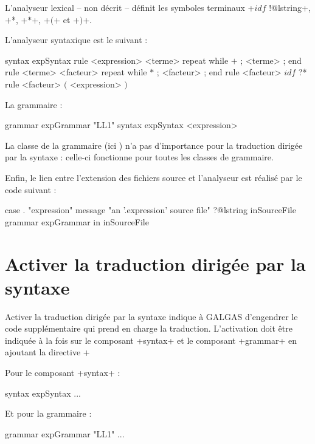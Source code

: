 L'analyseur lexical -- non décrit -- définit les symboles terminaux \ggs+$idf$ !@lstring+, \ggs*$+$*, \ggs+$*$+, \ggs+$($+ et \ggs+$)$+.

L'analyseur syntaxique est le suivant :
\begin{galgas}
syntax expSyntax {
  rule <expression> {
    <terme>
    repeat while $+$ ; <terme> ; end
  }
  rule <terme> {
    <facteur>
    repeat while $*$ ; <facteur> ; end
  }
  rule <facteur> {
    $idf$ ?*
  }
  rule <facteur> {
    $($
    <expression>
    $)$
  }
}
\end{galgas}

La grammaire :
\begin{galgas}
grammar expGrammar "LL1" {
  syntax expSyntax
  <expression>
}
\end{galgas}

La classe de la grammaire (ici ) n'a pas d'importance pour la traduction dirigée par la syntaxe : celle-ci fonctionne pour toutes les classes de grammaire. 

Enfin, le lien entre l'extension des fichiers source et l'analyseur est réalisé par le code suivant :
\begin{galgas}
case . "expression"
message "an '.expression' source file"
?@lstring inSourceFile {
  grammar expGrammar in inSourceFile
}
\end{galgas}








\section{Activer la traduction dirigée par la syntaxe}

Activer la traduction dirigée par la syntaxe indique à GALGAS d'engendrer le code supplémentaire qui prend en charge la traduction. L'activation doit être indiquée à la fois sur le composant \ggs+syntax+ et le composant \ggs+grammar+ en ajoutant la directive \ggs+%

Pour le composant \ggs+syntax+ :
\begin{galgas}
syntax expSyntax %
  ...
\end{galgas}

Et pour la grammaire :
\begin{galgas}
grammar expGrammar "LL1" %
  ...
\end{galgas}

